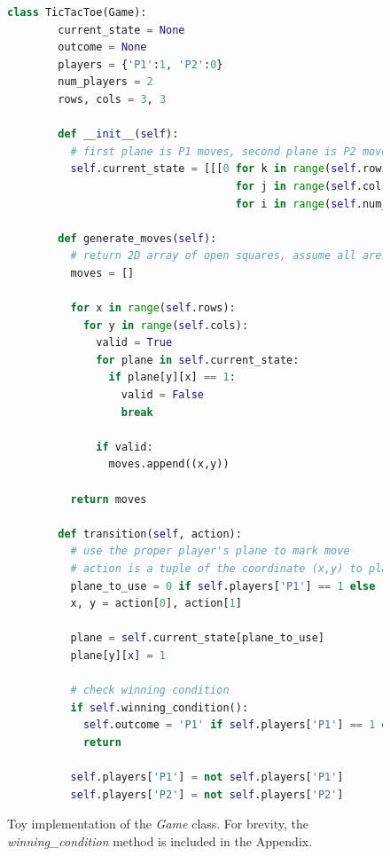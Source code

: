 \documentclass{article}
\begin{document}
  \begin{figure}[H]
    \lstset{basicstyle=\tiny}
    \begin{lstlisting}[language=Python]
      class TicTacToe(Game):
        current_state = None
        outcome = None
        players = {'P1':1, 'P2':0}
        num_players = 2
        rows, cols = 3, 3

        def __init__(self):
          # first plane is P1 moves, second plane is P2 moves
          self.current_state = [[[0 for k in range(self.rows)]
                                    for j in range(self.cols)]
                                    for i in range(self.num_players)]

        def generate_moves(self):
          # return 2D array of open squares, assume all are open. 0=closed, 1=open
          moves = []

          for x in range(self.rows):
            for y in range(self.cols):
              valid = True
              for plane in self.current_state:
                if plane[y][x] == 1:
                  valid = False
                  break

              if valid:
                moves.append((x,y))

          return moves

        def transition(self, action):
          # use the proper player's plane to mark move
          # action is a tuple of the coordinate (x,y) to play
          plane_to_use = 0 if self.players['P1'] == 1 else 1
          x, y = action[0], action[1]

          plane = self.current_state[plane_to_use]
          plane[y][x] = 1

          # check winning condition
          if self.winning_condition():
            self.outcome = 'P1' if self.players['P1'] == 1 else 'P2'
            return

          self.players['P1'] = not self.players['P1']
          self.players['P2'] = not self.players['P2']

    \end{lstlisting}
    \caption[Toy implementation of the \textit{Game} class]{Toy implementation of the \textit{Game} class. For brevity, the \textit{winning\_condition} method is included in the Appendix.}
    \label{fig:tic-tac-toe}
  \end{figure}
\end{document}
